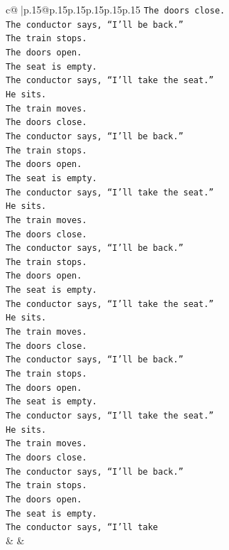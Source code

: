 \documentclass{article}
\begin{document}
{\begin{supertabular}{c@{$\;$}|p{.15\linewidth}@{}p{.15\linewidth}p{.15\linewidth}p{.15\linewidth}p{.15\linewidth}p{.15\linewidth}}
{{{\texttt{The doors close.} \\
\texttt{The conductor says, “I’ll be back.”} \\
\texttt{The train stops.} \\
\texttt{The doors open.} \\
\texttt{The seat is empty.} \\
\texttt{The conductor says, “I’ll take the seat.”} \\
\texttt{He sits.} \\
\texttt{The train moves.} \\
\texttt{The doors close.} \\
\texttt{The conductor says, “I’ll be back.”} \\
\texttt{The train stops.} \\
\texttt{The doors open.} \\
\texttt{The seat is empty.} \\
\texttt{The conductor says, “I’ll take the seat.”} \\
\texttt{He sits.} \\
\texttt{The train moves.} \\
\texttt{The doors close.} \\
\texttt{The conductor says, “I’ll be back.”} \\
\texttt{The train stops.} \\
\texttt{The doors open.} \\
\texttt{The seat is empty.} \\
\texttt{The conductor says, “I’ll take the seat.”} \\
\texttt{He sits.} \\
\texttt{The train moves.} \\
\texttt{The doors close.} \\
\texttt{The conductor says, “I’ll be back.”} \\
\texttt{The train stops.} \\
\texttt{The doors open.} \\
\texttt{The seat is empty.} \\
\texttt{The conductor says, “I’ll take the seat.”} \\
\texttt{He sits.} \\
\texttt{The train moves.} \\
\texttt{The doors close.} \\
\texttt{The conductor says, “I’ll be back.”} \\
\texttt{The train stops.} \\
\texttt{The doors open.} \\
\texttt{The seat is empty.} \\
\texttt{The conductor says, “I’ll take} \\
            }
        }
    }
    & & \\ \\


\end{supertabular}}
\end{document}

